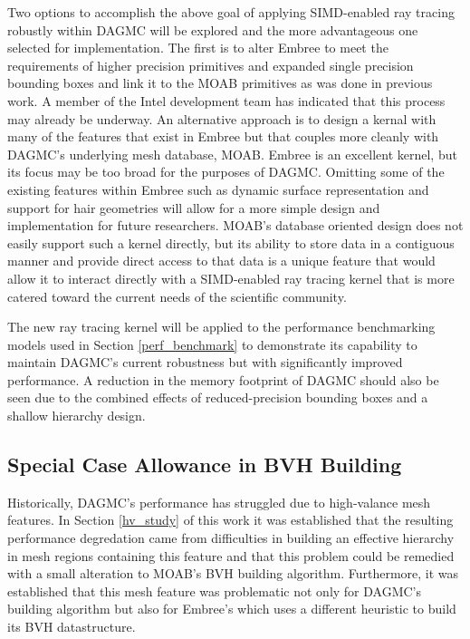 \documentclass[12pt, a4paper]{article}
\begin{document}
Two options to accomplish the above goal of applying SIMD-enabled ray tracing robustly within DAGMC will be explored and the more advantageous one selected for implementation. The first is to alter Embree to meet the requirements of higher precision primitives and expanded single precision bounding boxes and link it to the MOAB primitives as was done in previous work. A member of the Intel development team has indicated that this process may already be underway. An alternative approach is to design a kernal with many of the features that exist in Embree but that couples more cleanly with DAGMC's underlying mesh database, MOAB. Embree is an excellent kernel, but its focus may be too broad for the purposes of DAGMC. Omitting some of the existing features within Embree such as dynamic surface representation and support for hair geometries \cite{Woop_2014} will allow for a more simple design and implementation for future researchers. MOAB's database oriented design does not easily support such a kernel directly, but its ability to store data in a contiguous manner and provide direct access to that data is a unique feature that would allow it to interact directly with a SIMD-enabled ray tracing kernel that is more catered toward the current needs of the scientific community.

The new ray tracing kernel will be applied to the performance benchmarking models used in Section \ref{perf_benchmark} to demonstrate its capability to maintain DAGMC's current robustness but with significantly improved performance. A reduction in the memory footprint of DAGMC should also be seen due to the combined effects of reduced-precision bounding boxes and a shallow hierarchy design.

\subsection{Special Case Allowance in BVH Building}

Historically, DAGMC's performance has struggled due to high-valance mesh features. In Section \ref{hv_study} of this work it was established that the resulting performance degredation came from difficulties in building an effective hierarchy in mesh regions containing this feature and that this problem could be remedied with a small alteration to MOAB's BVH building algorithm. Furthermore, it was established that this mesh feature was problematic not only for DAGMC's building algorithm but also for Embree's which uses a different heuristic to build its BVH datastructure.
\end{document}
